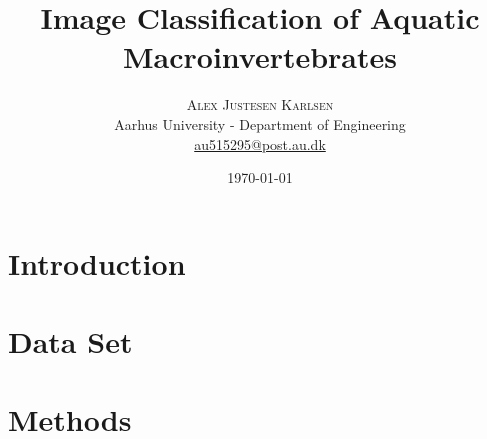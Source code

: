 

\setlength{\droptitle}{-4\baselineskip} %

\pretitle{\begin{center}\Huge\bfseries} %
\posttitle{\end{center}} %
\title{Image Classification of Aquatic Macroinvertebrates} %
\author{%
\textsc{Alex Justesen Karlsen} \\
\normalsize Aarhus University - Department of Engineering\\ %
\normalsize \href{mailto:au515295@post.au.dk}{au515295@post.au.dk} %
}
\date{\today} %
\renewcommand{\maketitlehookd}{%
\begin{abstract}
\noindent 
\end{abstract}
}




\maketitle


\section{Introduction} \label{sec:introduction}


\section{Data Set} \label{sec:dataset}


\section{Methods} \label{sec:methods}


